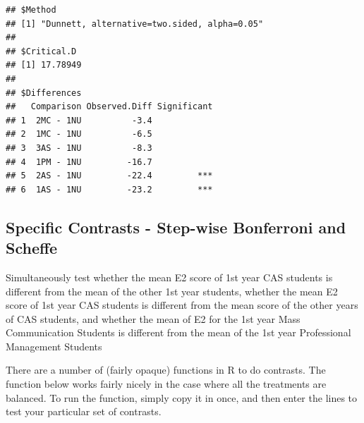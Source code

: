\documentclass[
]{book}
\begin{document}
\begin{verbatim}
## $Method
## [1] "Dunnett, alternative=two.sided, alpha=0.05"
## 
## $Critical.D
## [1] 17.78949
## 
## $Differences
##   Comparison Observed.Diff Significant
## 1  2MC - 1NU          -3.4            
## 2  1MC - 1NU          -6.5            
## 3  3AS - 1NU          -8.3            
## 4  1PM - 1NU         -16.7            
## 5  2AS - 1NU         -22.4         ***
## 6  1AS - 1NU         -23.2         ***
\end{verbatim}

\hypertarget{specific-contrasts---step-wise-bonferroni-and-scheffe}{%
\subsection{Specific Contrasts - Step-wise Bonferroni and Scheffe}\label{specific-contrasts---step-wise-bonferroni-and-scheffe}}

Simultaneously test whether the mean E2 score of 1st year CAS students is different from the mean of the other 1st year students, whether the mean E2 score of 1st year CAS students is different from the mean score of the other years of CAS students, and whether the mean of E2 for the 1st year Mass Communication Students is different from the mean of the 1st year Professional Management Students

There are a number of (fairly opaque) functions in R to do contrasts. The function below works fairly nicely in the case where all the treatments are balanced. To run the function, simply copy it in once, and then enter the lines to test your particular set of contrasts.
\end{document}
